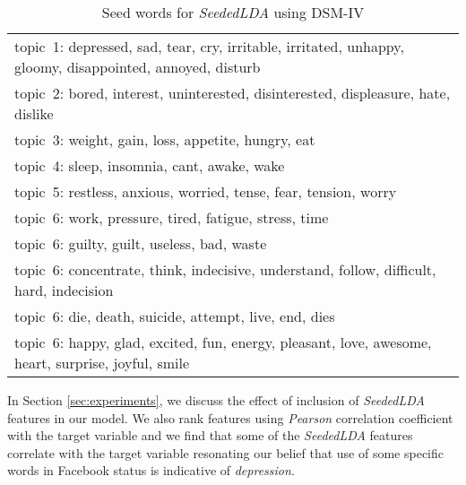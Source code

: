 \begin{table*} [ht!]
	\begin{tabular}{ l }
	\hline
{topic~1: depressed, sad, tear, cry, irritable, irritated, unhappy, gloomy, disappointed, annoyed, disturb}\\
{topic~2: bored, interest, uninterested, disinterested, displeasure, hate, dislike}\\
{topic~3: weight, gain, loss, appetite, hungry, eat}\\
{topic~4: sleep, insomnia, cant, awake, wake }\\
{topic~5: restless, anxious, worried, tense, fear, tension, worry}\\
{topic~6: work, pressure, tired, fatigue, stress, time}\\
{topic~6: guilty, guilt, useless, bad, waste}\\
{topic~6: concentrate, think, indecisive, understand, follow, difficult, hard, indecision}\\
{topic~6: die, death, suicide, attempt, live, end, dies}\\
{topic~6: happy, glad, excited, fun, energy, pleasant, love, awesome, heart, surprise, joyful, smile}\\
\hline
    \end{tabular}
      \caption{\noindent Seed words for \textit{SeededLDA} using DSM-IV}
        \label{table:seedwords_1}
\end{table*}

In Section \ref{sec:experiments}, we discuss the effect of inclusion of \textit{SeededLDA} features in our model. We also rank features using \textit{Pearson} correlation coefficient with the target variable and we find that some of the \textit{SeededLDA} features correlate with the target variable resonating our belief that use of some specific words in Facebook status is indicative of \textit{depression}.

